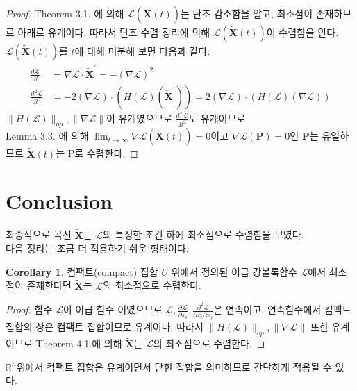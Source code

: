 \documentclass[a4paper,20pt]{article}
\theoremstyle{definition}
\newtheorem{corollary}{Corollary}[theorem]
\newcommand{\limit}[2][\infty]{\lim_{#2 \to #1}}
\newcommand{\curve}[1][X]{\tilde{\mathbf{#1}}}
\begin{document}
\begin{proof}
Theorem 3.1. 에 의해 $\mathcal{L}(\curve(t))$는 단조 감소함을 알고, 최소점이 존재하므로 아래로 유계이다. 따라서 단조 수렴 정리에 의해 $\mathcal{L}(\curve(t))$이 수렴함을 안다. $\mathcal{L}(\curve(t))$를 $t$에 대해 미분해 보면 다음과 같다.
\begin{align*}
\frac{d\mathcal{L}}{dt}&=\nabla\mathcal{L}\cdot\curve^{\prime} = -(\nabla\mathcal{L})^{2}\\
\frac{d^2\mathcal{L}}{dt^2}&=-2(\nabla\mathcal{L})\cdot(H(\mathcal{L})(\curve^{\prime}))=2(\nabla\mathcal{L})\cdot(H(\mathcal{L})(\nabla\mathcal{L}))
\end{align*}
$\|H(\mathcal{L})\|_{op}, \|\nabla\mathcal{L}\|$이 유계였으므로 $\frac{d^2\mathcal{L}}{dt^2}$도 유계이므로 
\\
Lemma 3.3. 에 의해 $\limit{t}\nabla\mathcal{L}(\curve(t))=0$이고 $\nabla\mathcal{L}(\mathbf{P})=0$인 $\mathbf{P}$는 유일하므로 $\curve(t)$는 P로 수렴한다.
\end{proof}


\section{Conclusion}

최종적으로 곡선 $\curve$는 $\mathcal{L}$의 특정한 조건 하에 최소점으로 수렴함을 보였다. \\
다음 정리는 조금 더 적용하기 쉬운 형태이다.

\begin{corollary}
컴팩트(compact) 집합 $U$ 위에서 정의된 이급 강볼록함수 $\mathcal{L}$에서 최소점이 존재한다면 $\curve$는 $\mathcal{L}$의 최소점으로 수렴한다.
\end{corollary}
\begin{proof}
함수 $\mathcal{L}$이 이급 함수 이였으므로 $\mathcal{L}, \frac{\partial\mathcal{L}}{\partial x_{i}}, \frac{\partial^{2}\mathcal{L}}{\partial x_{i}\partial x_{j}}$은 연속이고,
연속함수에서 컴팩트 집합의 상은 컴팩트 집합이므로 유계이다. 따라서 $\|H(\mathcal{L})\|_{op}, \|\nabla\mathcal{L}\|$ 또한 유계이므로 Theorem 4.1.에 의해 $\curve$는 $\mathcal{L}$의 최소점으로 수렴한다.
\end{proof}

$\mathbb{R}^{n}$위에서 컴팩트 집합은 유계이면서 닫힌 집합을 의미하므로 간단하게 적용될 수 있다.
\end{document}
